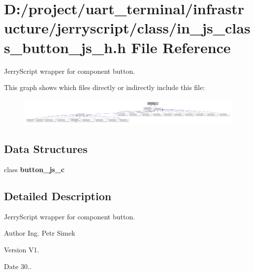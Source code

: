 \section{D\+:/project/uart\+\_\+terminal/infrastructure/jerryscript/class/in\+\_\+js\+\_\+class\+\_\+button\+\_\+js\+\_\+h.h File Reference}
\label{in__js__class__button__js__h_8h}


Jerry\+Script wrapper for component button.  


This graph shows which files directly or indirectly include this file\+:
\nopagebreak
\begin{figure}[H]
\begin{center}
\leavevmode
\includegraphics[width=350pt]{in__js__class__button__js__h_8h__dep__incl}
\end{center}
\end{figure}
\subsection*{Data Structures}
\begin{DoxyCompactItemize}
\item 
class \textbf{ button\+\_\+js\+\_\+c}
\end{DoxyCompactItemize}


\subsection{Detailed Description}
Jerry\+Script wrapper for component button. 

\begin{DoxyAuthor}{Author}
Ing. Petr Simek 
\end{DoxyAuthor}
\begin{DoxyVersion}{Version}
V1. 
\end{DoxyVersion}
\begin{DoxyDate}{Date}
30.. 
\end{DoxyDate}
